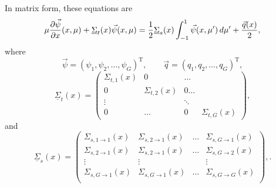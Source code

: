 In matrix form, these equations are
\begin{equation}\label{eq:MGmat}
\mu  \frac{\partial \vec{\psi}}{\partial x} (x,\mu) + \underline{\Sigma}_{t}(x) \vec{\psi}(x,\mu) =
\frac{1}{2}  \underline{\Sigma}_{s}(x) \int_{-1}^1 \vec{\psi}(x, \mu') \, d\mu' + \frac{\vec{q}(x)}{2},
\end{equation}
where
\begin{equation}\label{eq:vecs}
\vec{\psi} = (\psi_1, \psi_2, \dots, \psi_G)^\mathrm{T}, \qquad \vec{q} = (q_1, q_2, \dots, q_G)^\mathrm{T}, 
\end{equation}
\begin{equation}\label{eq:MatricesT}
 \underline{\Sigma}_{t}(x)  = \begin{pmatrix} \Sigma_{t,1}(x) & 0 & \dots\\
 0 & \Sigma_{t,2}(x) & 0 \dots \\
 \vdots & & \ddots\\ 
 0 & \dots & 0 & \Sigma_{t,G}(x) 
 \end{pmatrix}, 
\end{equation}
and
\begin{equation}\label{eq:MatricesS}
 \underline{\Sigma}_{s}(x)  = \begin{pmatrix} \Sigma_{s,1\rightarrow 1}(x) & \Sigma_{s,2\rightarrow 1}(x)  & \dots & \Sigma_{s,G\rightarrow 1}(x) \\
 \Sigma_{s,2\rightarrow 1}(x) & \Sigma_{s,2\rightarrow 1}(x)  & \dots & \Sigma_{s,G\rightarrow 2}(x) \\
 \vdots & \vdots & & \vdots\\
 \Sigma_{s,G\rightarrow 1}(x) & \Sigma_{s,G\rightarrow 1}(x)  & \dots & \Sigma_{s,G\rightarrow G}(x) \\
 \end{pmatrix},.
\end{equation}
